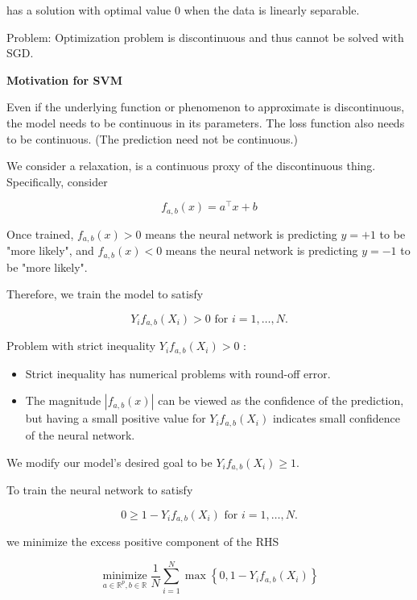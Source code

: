 has a solution with optimal value 0 when the data is linearly separable.

Problem: Optimization problem is discontinuous and thus cannot be solved with SGD.

\par\noindent\textcolor{gray}{\hdashrule{\textwidth}{0.4pt}{1pt 2pt}}

\textbf{Motivation for SVM}

Even if the underlying function or phenomenon to approximate is discontinuous, the model needs to be continuous in its parameters. The loss function also needs to be continuous. (The prediction need not be continuous.)

We consider a relaxation, is a continuous proxy of the discontinuous thing. Specifically, consider

$$
f_{a, b}(x)=a^{\top} x+b
$$

Once trained, $f_{a, b}(x)>0$ means the neural network is predicting $y=+1$ to be "more likely", and $f_{a, b}(x)<0$ means the neural network is predicting $y=-1$ to be "more likely".

Therefore, we train the model to satisfy

$$
Y_{i} f_{a, b}\left(X_{i}\right)>0 \text { for } i=1, \ldots, N .
$$

Problem with strict inequality $Y_{i} f_{a, b}\left(X_{i}\right)>0$ :

\begin{itemize}
    \item Strict inequality has numerical problems with round-off error.
    \item The magnitude $\left|f_{a, b}(x)\right|$ can be viewed as the confidence of the prediction, but having a small positive value for $Y_{i} f_{a, b}\left(X_{i}\right)$ indicates small confidence of the neural network.
\end{itemize}

We modify our model's desired goal to be $Y_{i} f_{a, b}\left(X_{i}\right) \geq 1$.

To train the neural network to satisfy

$$
0 \geq 1-Y_{i} f_{a, b}\left(X_{i}\right) \text { for } i=1, \ldots, N .
$$

we minimize the excess positive component of the RHS

$$
\underset{a \in \mathbb{R}^{p}, b \in \mathbb{R}}{\operatorname{minimize}} \frac{1}{N} \sum_{i=1}^{N} \max \left\{0,1-Y_{i} f_{a, b}\left(X_{i}\right)\right\}
$$

